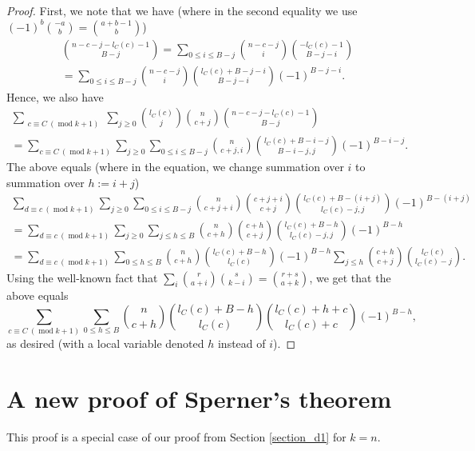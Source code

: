 \documentclass[11pt, reqno]{amsart}
\numberwithin{equation}{section}
\newcommand\modd{\operatorname{mod}}
\begin{document}
\begin{proof}
    First, we note that we have (where in the second equality we use $(-1)^b\binom{-a}{b}=\binom{a+b-1}{b}$)
    \begin{multline*}
        \binom{n-c-j-l_C(c)-1}{B-j}
        =\sum_{0 \leqslant i \leqslant B-j} \binom{n-c-j}{i} \binom{-l_C(c)-1}{B-j-i}\\
        =\sum_{0 \leqslant i \leqslant B-j} \binom{n-c-j}{i} \binom{l_C(c)+B-j-i}{B-j-i} (-1)^{B-j-i}.
    \end{multline*}
    Hence, we also have
    \begin{multline*}
        \sum_{\substack{c \equiv C \ (\modd k+1)}} \sum_{j \geqslant 0} \binom{l_C(c)}{j} \binom{n}{c+j} \binom{n-c-j-l_C(c)-1}{B-j}\\
        = \sum_{c \equiv C \ (\modd k+1)} \sum_{j \geqslant 0} \sum_{0 \leqslant i \leqslant B-j} \binom{n}{c+j, i} \binom{l_C(c)+B-i-j}{B-i-j, j} (-1)^{B-i-j}.
    \end{multline*}
    The above equals (where in the equation, we change summation over $i$ to summation over $h:=i+j$)
    \begin{multline*}
        \sum_{d \equiv c \ (\modd k+1)} \sum_{j \geqslant 0} \sum_{0 \leqslant i \leqslant B-j} \binom{n}{c+j+i} \binom{c+j+i}{c+j} \binom{l_C(c)+B-(i+j)}{l_C(c)-j, j} (-1)^{B-(i+j)}\\
        = \sum_{d \equiv c \ (\modd k+1)} \sum_{j \geqslant 0} \sum_{j \leqslant h \leqslant B} \binom{n}{c+h} \binom{c+h}{c+j} \binom{l_C(c)+B-h}{l_C(c)-j, j}(-1)^{B-h}\\
        = \sum_{d \equiv c \ (\modd k+1)} \sum_{0 \leqslant h \leqslant B} \binom{n}{c+h} \binom{l_C(c)+B-h}{l_C(c)} (-1)^{B-h} \sum_{j \leqslant h} \binom{c+h}{c+j} \binom{l_C(c)}{l_C(c)-j}.
    \end{multline*}
    Using the well-known fact that $\sum_{i} \binom{r}{a+i}\binom{s}{k-i}=\binom{r+s}{a+k}$, we get that the above equals
    \begin{equation*}
        \sum_{c \equiv C \ (\modd k+1)} \sum_{0 \leqslant h \leqslant B} \binom{n}{c+h} \binom{l_C(c)+B-h}{l_C(c)} \binom{l_C(c)+h+c}{l_C(c)+c}(-1)^{B-h},
    \end{equation*}
    as desired (with a local variable denoted $h$ instead of $i$).
\end{proof}

\section{A new proof of Sperner's theorem}
\label{appendix_sperner}
This proof is a special case of our proof from Section \ref{section_d1} for $k=n$.
\end{document}
